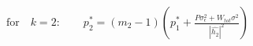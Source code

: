 \documentclass[preview]{standalone}
\begin{document}
\begin{align*}
\text{for} \quad k=2: \qquad p_2^\ast = \left(m_2 - 1\right) \left(p_1^\ast + \frac{P \sigma_\epsilon^2 + W_{tot} \sigma^2}{\left|\hat{h_2}\right|^2}\right)
\end{align*}
\end{document}
